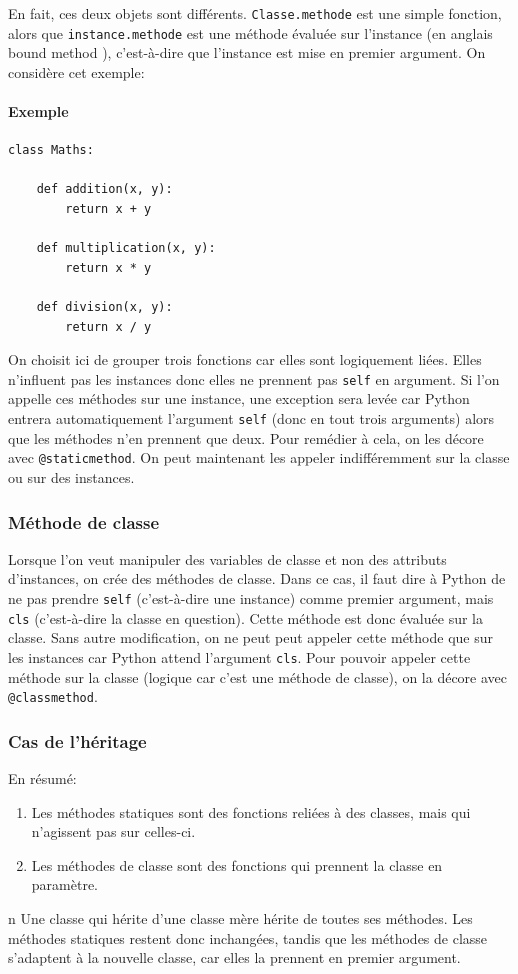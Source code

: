\documentclass[a4paper, 10pt]{article}
\newcommand{\code}[1]{{\small\texttt{#1}}}
\begin{document}
En fait, ces deux objets sont différents. \code{Classe.methode} est une simple fonction, alors que \code{instance.methode} est une méthode évaluée sur l'instance (en anglais \og bound method \fg{}), c'est-à-dire que l'instance est mise en premier argument. On considère cet exemple:

\paragraph{Exemple}
\begin{verbatim}
class Maths:

    def addition(x, y):
        return x + y

    def multiplication(x, y):
        return x * y

    def division(x, y):
        return x / y
\end{verbatim}
On choisit ici de grouper trois fonctions car elles sont logiquement liées. Elles n'influent pas les instances donc elles ne prennent pas \code{self} en argument. Si l'on appelle ces méthodes sur une instance, une exception sera levée car Python entrera automatiquement l'argument \code{self} (donc en tout trois arguments) alors que les méthodes n'en prennent que deux. Pour remédier à cela, on les décore avec \code{@staticmethod}. On peut maintenant les appeler indifféremment sur la classe ou sur des instances.

\subsubsection{Méthode de classe}
Lorsque l'on veut manipuler des variables de classe et non des attributs d'instances, on crée des méthodes de classe. Dans ce cas, il faut dire à Python de ne pas prendre \code{self} (c'est-à-dire une instance) comme premier argument, mais \code{cls} (c'est-à-dire la classe en question). Cette méthode est donc évaluée sur la classe. Sans autre modification, on ne peut peut appeler cette méthode que sur les instances car Python attend l'argument \code{cls}. Pour pouvoir appeler cette méthode sur la classe (logique car c'est une méthode de classe), on la décore avec \code{@classmethod}.

\subsubsection{Cas de l'héritage}
En résumé:
\begin{enumerate}
        \item Les méthodes statiques sont des fonctions reliées à des classes, mais qui n'agissent pas sur celles-ci.
        \item Les méthodes de classe sont des fonctions qui prennent la classe en paramètre.
\end{enumerate}
n
Une classe qui hérite d'une classe mère hérite de toutes ses méthodes. Les méthodes statiques restent donc inchangées, tandis que les méthodes de classe s'adaptent à la nouvelle classe, car elles la prennent en premier argument.
\end{document}
